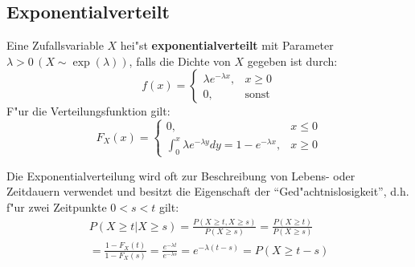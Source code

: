 \documentclass[a4paper,11pt]{book}
\theoremstyle{nonumberplain}
\begin{document}
\subsection{Exponentialverteilt}
Eine Zufallsvariable $X$ hei"st \textbf{exponentialverteilt} mit Parameter $\lambda>0\,(X\sim \exp(\lambda))$, falls die Dichte von $X$ gegeben ist durch:
\[f(x)=
\begin{cases}
\lambda e^{-\lambda x}, & x\geq 0\\
0, & \text{sonst}
\end{cases}
\]
F"ur die Verteilungsfunktion gilt:
\[F_X(x)=
\begin{cases}
0, & x\leq 0\\
\int_0^x\lambda e^{-\lambda y}dy = 1-e^{-\lambda x}, & x\geq 0
\end{cases}
\]

Die Exponentialverteilung wird oft zur Beschreibung von Lebens- oder Zeitdauern verwendet und besitzt die Eigenschaft der "`Ged"achtnislosigkeit"', d.h. f"ur zwei Zeitpunkte $0<s<t$ gilt:\\
\begin{multline*}
P(X\geq t|X\geq s)=\frac{P(X\geq t,X\geq s)}{P(X\geq s)}= \frac{P(X\geq t)}{P(X\geq s)}
\\ =\frac{1-F_X(t)}{1-F_X(s)} = \frac{e^{-\lambda t}}{e^{-\lambda s}}=e^{-\lambda (t-s)}=P(X\geq t-s)
\end{multline*}
\end{document}
